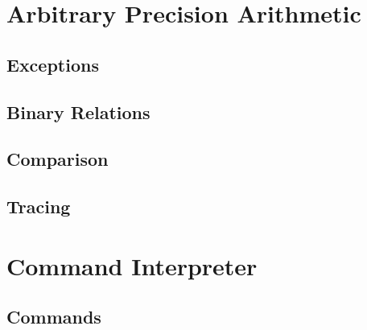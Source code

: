 \documentclass[12pt]{article}
\begin{document}
  

  

  \section{Arbitrary Precision Arithmetic}\label{sec:apa}

   
 
   

  \subsection{Exceptions}\label{subsec:exceptions}

   

   

  \subsection{Binary Relations}\label{subsec:binrel}

   

   

  \subsection{Comparison}\label{subsec:cmp}

   

   
 
  \subsection{Tracing}\label{subsec:trace}

   

   

 \section{Command Interpreter}\label{sec:interpreter}

  \subsection{Commands}\label{subsec:cmd}
\end{document}
